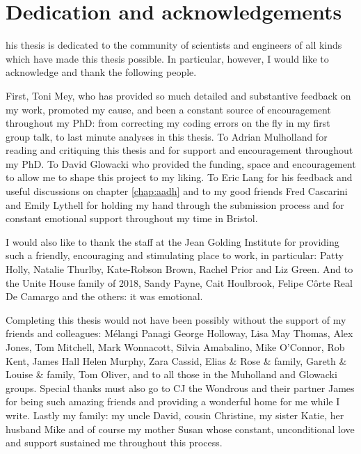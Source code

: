 %
%

\chapter*{Dedication and acknowledgements}
\begin{SingleSpace}
his thesis is dedicated to the community of scientists and engineers of all kinds which have made this thesis possible. In particular, however, I would like to acknowledge and thank the following people. 

First, Toni Mey, who has provided so much detailed and substantive feedback on my work, promoted my cause, and been a constant source of encouragement throughout my PhD: from correcting my coding errors on the fly in my first group talk, to last minute analyses in this thesis. To Adrian Mulholland for reading and critiquing this thesis and for support and encouragement throughout my PhD. To David Glowacki who provided the funding, space and encouragement to allow me to shape this project to my liking. To Eric Lang for his feedback and useful discussions on chapter \ref{chap:aadh} and to my good friends Fred Cascarini and Emily Lythell for holding my hand through the submission process and for constant emotional support throughout my time in Bristol.  

I would also like to thank the staff at the Jean Golding Institute for providing such a friendly, encouraging and stimulating place to work, in particular: Patty Holly, Natalie Thurlby, Kate-Robson Brown, Rachel Prior and Liz Green. And to the Unite House family of 2018, Sandy Payne, Cait Houlbrook, Felipe C\^{o}rte Real De Camargo and the others: it was emotional. 

Completing this thesis would not have been possibly without the support of my friends and colleagues: M\'{e}langi Panagi George Holloway, Lisa May Thomas, Alex Jones, Tom Mitchell, Mark Wonnacott, Silvia Amabalino, Mike O'Connor, Rob Kent, James Hall  Helen Murphy, Zara Cassid, Elias \& Rose \& family, Gareth \& Louise \& family, Tom Oliver, and to all those in the Muholland and Glowacki groups. Special thanks must also go to CJ the Wondrous and their partner James for being such amazing friends and providing a wonderful home for me while I write. Lastly my family: my uncle David, cousin Christine, my sister Katie, her husband Mike and of course my mother Susan whose constant, unconditional love and support sustained me throughout this process. 

\end{SingleSpace}
\clearpage